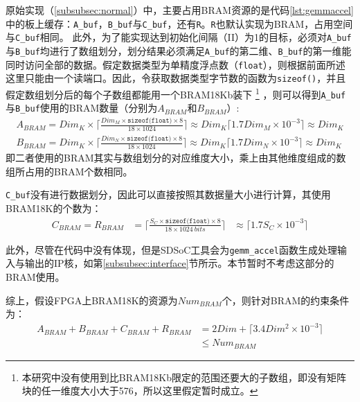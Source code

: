 原始实现（\ref{subsubsec:normal}）中，主要占用BRAM资源的是代码\ref{lst:gemmaccel}中的板上缓存：\texttt{A\_buf}，\texttt{B\_buf}与\texttt{C\_buf}，还有\texttt{R}。\texttt{R}也默认实现为BRAM，占用空间与\texttt{C\_buf}相同。
此外，为了能实现达到初始化间隔（II）为1的目标，必须对\texttt{A\_buf}与\texttt{B\_buf}均进行了数组划分，划分结果必须满足\texttt{A\_buf}的第二维、\texttt{B\_buf}的第一维能同时访问全部的数据。假定数据类型为单精度浮点数（\texttt{float}），则根据前面所述这里只能由一个读端口。因此，令获取数据类型字节数的函数为\texttt{sizeof()}，并且假定数组划分后的每个子数组都能用一个BRAM18Kb装下
\footnote{本研究中没有使用到比BRAM18Kb限定的范围还要大的子数组，即没有矩阵块的任一维度大小大于576，所以这里假定暂时成立。}
，则可以得到\texttt{A\_buf}与\texttt{B\_buf}使用的BRAM数量（分别为\(\mathit{A_{BRAM}}\)和\(\mathit{B_{BRAM}}\)）:
\begin{align}
\mathit{A_{BRAM} 
	= Dim_K \times 
	\lceil 
	\frac{Dim_M\times \texttt{sizeof(float)} \times 8}{18 \times 1024} 
	\rceil
	\approx Dim_K\lceil 1.7Dim_M \times 10^{-3} \rceil
	\approx Dim_K }
\label{eq:Abram}\\
\mathit{B_{BRAM}
	= Dim_K \times 
	\lceil 
	\frac{Dim_N\times \texttt{sizeof(float)} \times 8}{18 \times 1024} 
	\rceil
	\approx Dim_K\lceil 1.7Dim_N \times 10^{-3} \rceil
	\approx Dim_K}
\label{eq:Bbram}
\end{align}
即二者使用的BRAM其实与数组划分的对应维度大小，乘上由其他维度组成的数组所占用的BRAM个数相同。

%
\texttt{C\_buf}没有进行数据划分，因此可以直接按照其数据量大小进行计算，其使用BRAM18K的个数为：
\begin{equation}\label{eq:Cbram}
\begin{aligned}
\mathit{C_{BRAM} = R_{BRAM}}
& = \lceil \mathit{
	\frac{S_C\times \texttt{sizeof(float)} \times 8}
	{18 \times 1024\ bits}} \rceil
& \approx \lceil \mathit{1.7S_C \times 10^{-3}} \rceil
\end{aligned}
\end{equation}

此外，尽管在代码中没有体现，但是SDSoC工具会为\texttt{gemm\_accel}函数生成处理输入与输出的IP核，如第\ref{subsubsec:interface}节所示。本节暂时不考虑这部分的BRAM使用。

综上，假设FPGA上BRAM18K的资源为\(\mathit{Num_{BRAM}}\)个，则针对BRAM的约束条件为：
\begin{equation}\label{eq:bram}
\begin{aligned}
\mathit{A_{BRAM} + B_{BRAM} + C_{BRAM} + R_{BRAM}}
& = \mathit{2Dim} + \lceil \mathit{3.4 Dim^2 \times 10^{-3}} \rceil \\
& \leq \mathit{Num_{BRAM}}
\end{aligned}
\end{equation}

